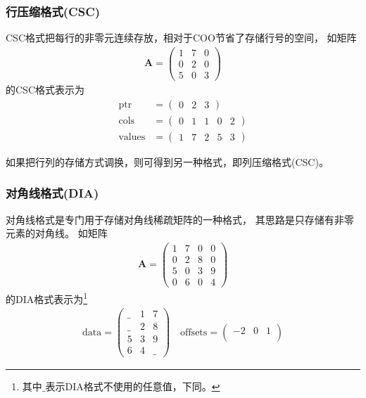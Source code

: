 \subsubsection{行压缩格式(CSC)}
CSC格式把每行的非零元连续存放，相对于COO节省了存储行号的空间，
如矩阵
\begin{align*}
\bm{A}=\begin{pmatrix}
1 & 7 & 0\\
0 & 2 & 0\\
5 & 0 & 3
\end{pmatrix}
\end{align*}
的CSC格式表示为
\begin{align*}
\mathrm{ptr}&=\begin{pmatrix}
0 & 2 & 3  
\end{pmatrix}
\\
\mathrm{cols}&=\begin{pmatrix}
0 & 1 & 1 & 0 & 2
\end{pmatrix}
\\
\mathrm{values}&=\begin{pmatrix}
1 & 7 & 2 & 5 & 3
\end{pmatrix}
\end{align*}

如果把行列的存储方式调换，则可得到另一种格式，即列压缩格式(CSC)。

\subsubsection{对角线格式(DIA)}
对角线格式是专门用于存储对角线稀疏矩阵的一种格式，
其思路是只存储有非零元素的对角线。
如矩阵\cite{bell2008spmv}
\begin{align*}
\bm{A}=\begin{pmatrix}
1 & 7 & 0 & 0\\
0 & 2 & 8 & 0\\
5 & 0 & 3 & 9\\
0 & 6 & 0 & 4
\end{pmatrix}
\end{align*}
的DIA格式表示为\footnote{其中$\_$表示DIA格式不使用的任意值，下同。}
\begin{align*}
\mathrm{data}=\begin{pmatrix}
\_ & 1 & 7\\
\_ & 2 & 8\\
5 & 3 & 9\\
6 & 4 & \_
\end{pmatrix}
\quad
\mathrm{offsets}=\begin{pmatrix}
-2 & 0 & 1\\
\end{pmatrix}
\end{align*}


